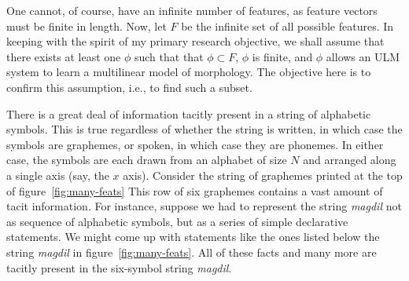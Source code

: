 One cannot, of course, have an infinite number of features, as feature vectors must be finite in length.
Now, let $F$ be the infinite set of all possible features. In keeping with the spirit of my primary research objective, we shall assume that there exists at least one $\phi$ such that that $\phi \subset F$, $\phi$ is finite, and $\phi$ allows an ULM system to learn a multilinear model of morphology. The objective here is to confirm this assumption, i.e., to find such a subset.

There is a great deal of information tacitly present in a string of alphabetic symbols.
	 This is true regardless of whether the string is written, in which case the 
	 symbols are graphemes, or spoken, in which case they are phonemes. In either 
	 case, the symbols are each drawn from an alphabet of size $N$ and arranged 
	 along a single axis (say, the $x$ axis).
Consider the string of graphemes printed at the top of figure~\ref{fig:many-feats}
This row of six graphemes contains a vast amount of tacit information. For instance, 
suppose we had to represent the string \textit{magdil} not as sequence of alphabetic 
symbols, but as a series of simple declarative statements. We might come up with 
statements like the ones listed below the string \textit{magdil} in figure~\ref{fig:many-feats}. All of these
facts and many more are tacitly present in the six-symbol string \textit{magdil}.

